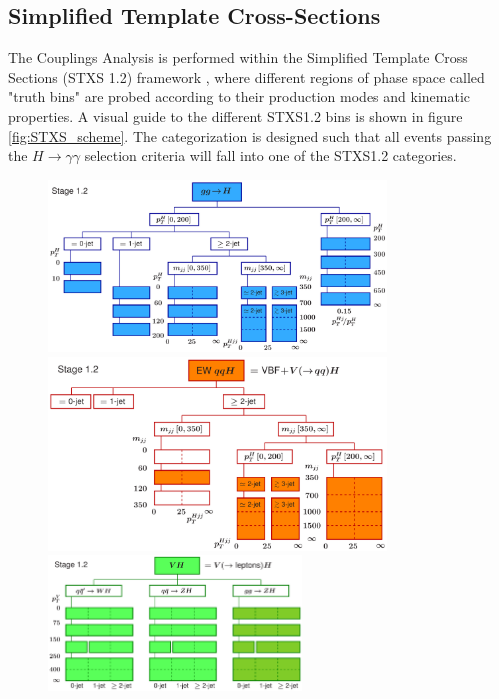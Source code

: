 \subsection{Simplified Template Cross-Sections} \label{sec:STXS}

The Couplings Analysis is performed within the Simplified Template Cross Sections (STXS 1.2) framework \cite{YellowReport4}, where different regions of phase space called "truth bins" are probed according to their production modes and kinematic properties. A visual guide to the different STXS1.2 bins is shown in figure \ref{fig:STXS_scheme}. The categorization is designed such that all events passing the $H \rightarrow \gamma \gamma$ selection criteria will fall into one of the STXS1.2 categories.

\begin{figure}[tbp]
  \centering
  \includegraphics[width=0.8\textwidth]{figures/theory_chapter/simplifiedXS_ggF_1_2} \\[3mm]
  \includegraphics[width=0.8\textwidth]{figures/theory_chapter/simplifiedXS_VBF_1_2} \\[3mm]
  \includegraphics[width=0.6\textwidth]{figures/theory_chapter/simplifiedXS_VH_1_2}

\end{figure}
